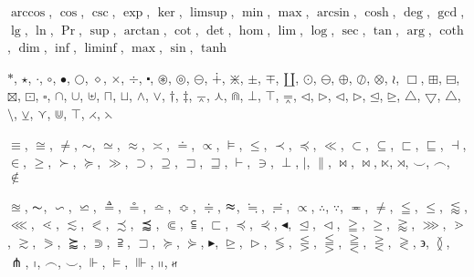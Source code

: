 \documentclass[a4paper,11pt]{article}
\begin{document}
\vspace{1em}





\noindent
$\arccos$, $\cos$, $\csc$, $\exp$, $\ker$, $\limsup$, $\min$, $\max$,
$\arcsin$, $\cosh$, $\deg$, $\gcd$, $\lg$, $\ln$, $\Pr$, $\sup$,
$\arctan$, $\cot$, $\det$, $\hom$, $\lim$, $\log$, $\sec$, $\tan$,
$\arg$, $\coth$, $\dim$, $\inf$, $\liminf$, $\max$, $\sin$, $\tanh$

\vspace{1em}





\noindent
$\ast$, $\star$, $\cdot$, $\circ$, $\bullet$, $\bigcirc$, $\diamond$, $\times$, $\div$, $\centerdot$, $\circledast$,
$\circledcirc$, $\circleddash$, $\dotplus$, $\divideontimes$, $\pm$, $\mp$, $\amalg$, $\odot$, $\ominus$, $\oplus$, $\oslash$,
$\otimes$, $\wr$, $\Box$, $\boxplus$, $\boxminus$, $\boxtimes$, $\boxdot$, $\square$, $\cap$, $\cup$,
$\uplus$, $\sqcap$, $\sqcup$, $\wedge$, $\vee$, $\dagger$, $\ddagger$, $\barwedge$, $\curlywedge$, $\Cap$, $\bot$,
$\intercal$, $\doublebarwedge$, $\lhd$, $\rhd$, $\triangleleft$, $\triangleright$, $\unlhd$,
$\unrhd$, $\triangle$, $\bigtriangledown$, $\bigtriangleup$, $\setminus$, $\veebar$, $\curlyvee$, $\Cup$, $\top$,
$\rightthreetimes$, $\leftthreetimes$

\vspace{1em}





\noindent
$\equiv$, $\cong$, $\neq$, $\sim$, $\simeq$, $\approx$, $\asymp$, $\doteq$, $\propto$, $\models$, $\leq$, $\prec$, $\preceq$,
$\ll$, $\subset$, $\subseteq$, $\sqsubset$, $\sqsubseteq$, $\dashv$, $\in$, $\geq$, $\succ$, $\succeq$, $\gg$, $\supset$,
$\supseteq$, $\sqsupset$, $\sqsupseteq$, $\vdash$, $\ni$, $\perp$, $\mid$, $\parallel$, $\bowtie$, $\Join$, $\ltimes$, $\rtimes$, $\smile$, $\frown$,
$\notin$

\vspace{1em}





\noindent
$\approxeq$, $\thicksim$, $\backsim$, $\backsimeq$, $\triangleq$, $\circeq$, $\bumpeq$, $\Bumpeq$, $\doteqdot$, $\thickapprox$, $\fallingdotseq$, $\risingdotseq$, $\varpropto$,
$\therefore$, $\because$, $\eqcirc$, $\neq$, $\leqq$, $\leqslant$, $\lessapprox$, $\lll$, $\lessdot$, $\lesssim$,
$\eqslantless$, $\precsim$, $\precapprox$, $\Subset$, $\subseteqq$, $\sqsubset$, $\preccurlyeq$, $\curlyeqprec$, $\blacktriangleleft$,
$\trianglelefteq$, $\vartriangleleft$, $\geqq$, $\geqslant$, $\gtrapprox$, $\ggg$, $\gtrdot$, $\gtrsim$, $\eqslantgtr$, $\succapprox$, $\Supset$,
$\supseteqq$, $\sqsupset$, $\succcurlyeq$, $\curlyeqsucc$, $\blacktriangleright$, $\trianglerighteq$, $\vartriangleright$, $\lessgtr$, $\lesseqgtr$,
$\lesseqqgtr$, $\gtreqqless$, $\gtreqless$, $\gtrless$, $\backepsilon$, $\between$, $\pitchfork$, $\shortmid$, $\smallfrown$, $\smallsmile$,
$\Vdash$, $\vDash$, $\Vvdash$, $\shortparallel$, $\nshortparallel$
\end{document}
